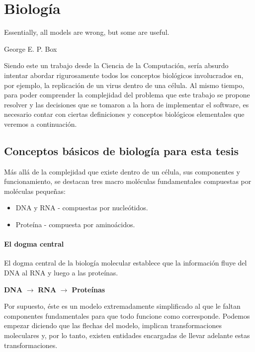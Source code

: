 \chapter{Biolog\'ia}
\label{biologia}
\epigraph{Essentially, all models are wrong, but some are useful.}%
{George E. P. Box}

Siendo este un trabajo desde la Ciencia de la Computaci\'on, ser\'ia absurdo
intentar abordar rigurosamente todos los conceptos biol\'ogicos involucrados
en, por ejemplo, la replicaci\'on de un virus dentro de una c\'elula. Al mismo
tiempo, para poder comprender la complejidad del problema que este trabajo se
propone resolver y las decisiones que se tomaron a la hora de implementar el
software, es necesario contar con ciertas definiciones y conceptos biol\'ogicos
elementales que veremos a continuaci\'on.

\section{Conceptos b\'asicos de biolog\'ia para esta tesis}
\label{bio-esencial}

M\'as all\'a de la complejidad que existe dentro de un c\'elula, sus componentes
y funcionamiento, se destacan tres macro mol\'eculas fundamentales compuestas
por mol\'eculas peque\~nas:
\begin{itemize}
 \item \ac{DNA} y \ac{RNA} - compuestas por nucle\'otidos. 
 \item Prote\'ina - compuesta por amino\'acidos.
\end{itemize}

\subsubsection{El dogma central}

El dogma central de la biolog\'ia molecular establece que la informaci\'on
fluye del \ac{DNA} al \ac{RNA} y luego a las prote\'inas.
\begin{center}
 \textbf{DNA} $\longrightarrow$ \textbf{RNA} $\longrightarrow$
\textbf{Prote\'inas}
\end{center}

Por supuesto, \'este es un modelo extremadamente simplificado al que le faltan
componentes fundamentales para que todo funcione como corresponde. Podemos
empezar diciendo que las flechas del modelo, implican transformaciones
moleculares y, por lo tanto, existen entidades encargadas de llevar adelante
estas transformaciones. 

